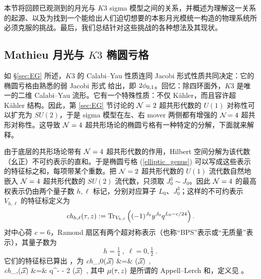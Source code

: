 
本节将回顾已观测到的月光与 $K3$ sigma 模型之间的关系，并概述为理解这一关系的起源、以及为找到一个能给出人们迫切想要的本影月光模统一构造的物理系统所必须克服的挑战。最后，我们总结针对这些挑战的各种想法及其现状。

\subsection{Mathieu 月光与 $K3$ 椭圆亏格}
\label{sec:M24moonshine}

如 \S\ref{sec:EG} 所述，$K3$ 的 Calabi--Yau 性质连同 Jacobi 形式性质共同决定：它的椭圆亏格由熟悉的弱 Jacobi 形式  给出，即 $2\phi_{0,1}$。回忆：除四环面外，$K3$ 是唯一的二维 Calabi--Yau 流形。它有一个特殊性质：不仅 K\"ahler，而且容许超 K\"ahler 结构。因此，第 \ref{sec:EG} 节讨论的 ${\cal N}=2$ 超共形代数的 $U(1)$ 对称性可以扩充为 $SU(2)$，于是 sigma 模型在左、右 mover 两侧都有增强的 ${\cal N}\!=4$ 超共形对称性。这导致 ${\cal N}=4$ 超共形场论的椭圆亏格有一种特定的分解，下面就来解释。

由于底层的共形场论带有 ${\cal N}=4$ 超共形代数的作用，Hilbert 空间分解为该代数（幺正）不可约表示的直和。于是椭圆亏格 (\ref{elliptic_genus}) 可以写成这些表示的特征标之和，每项带某个重数。把 ${\cal N}=2$ 超共形代数的 $U(1)$ 流代数自然地嵌入 ${\cal N}=4$ 超共形代数的 $SU(2)$ 流代数，只须取 $J_0^3 \sim J_0$。因此 ${\cal N}=4$ 的最高权表示仍由两个量子数 $h,\ell$ 标记，分别对应算子 $L_0$、$J_0^3$；这样的不可约表示 $V_{h,\ell}$ 的特征标定义为
$$
{\it ch}_{h,\ell}(\tau,z) := \operatorname{Tr}_{V_{h,\ell}} \left( (-1)^{J_0}y^{J_0} q^{L_0-c/24}\right) .
$$
对中心荷 $c=6$，Ramond 扇区有两个超对称表示（也称“BPS”表示或“无质量”表示），其量子数为
$$
h=\tfrac{1}{4}\;,\; \ell = 0 ,\tfrac{1}{2} \;.
$$
它们的特征标已算出 \cite{Eguchi1987,Eguchi1988,Eguchi1988a}，为
\bea\label{massless_characters}
{\it ch}_{,0}(\t,z) &=&  \m(\t,z)\, ,\\\notag
{\it ch}_{,}(\t,z) &=& q^{-}  - 2  \m(\t,z)\, ,
\eea 
其中 $\mu(\tau,z)$ 是所谓的 Appell--Lerch 和，定义见 。

